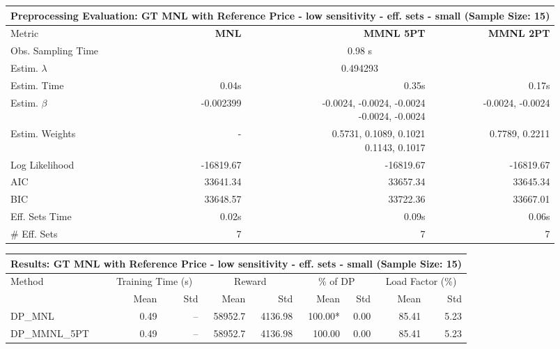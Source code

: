
\begin{samepage}
\begin{center}
  \small
  \begin{tabular}{l|r|r|r}
    \toprule
    \multicolumn{4}{c}{\textbf{Preprocessing Evaluation: GT MNL with Reference Price - low sensitivity - eff. sets - small (Sample Size: 15)}} \\
    \midrule
    Metric & \textbf{MNL} & \textbf{MMNL 5PT} & \textbf{MMNL 2PT} \\
    \midrule
    Obs. Sampling Time & \multicolumn{3}{c}{0.98 s} \\
    Estim. $\lambda$ & \multicolumn{3}{c}{0.494293} \\
    Estim. Time & 0.04s & 0.35s & 0.17s \\
    Estim. $\beta$ & -0.002399 & \makecell[tr]{-0.0024, -0.0024, -0.0024 \\ -0.0024, -0.0024} & -0.0024, -0.0024 \\
    Estim. Weights & - & \makecell[tr]{0.5731, 0.1089, 0.1021 \\ 0.1143, 0.1017} & 0.7789, 0.2211 \\
    Log Likelihood & -16819.67 & -16819.67 & -16819.67 \\
    AIC & 33641.34 & 33657.34 & 33645.34 \\
    BIC & 33648.57 & 33722.36 & 33667.01 \\
    Eff. Sets Time & 0.02s & 0.09s & 0.06s \\
    \# Eff. Sets & 7 & 7 & 7 \\
    \bottomrule
  \end{tabular}
\end{center}
\begin{center}
  \small
  \begin{tabular}{l|rr|rr|rr|rr}
    \toprule
    \multicolumn{9}{c}{\textbf{Results: GT MNL with Reference Price - low sensitivity - eff. sets - small (Sample Size: 15)}} \\
    \midrule
    Method & \multicolumn{2}{c|}{Training Time (s)} & \multicolumn{2}{c|}{Reward} & \multicolumn{2}{c|}{\% of DP} & \multicolumn{2}{c}{Load Factor (\%)} \\
    & Mean & Std & Mean & Std & Mean & Std & Mean & Std \\
    \midrule
    DP\_MNL      &     0.49 &    -- &    58952.7 &    4136.98 & 100.00* &    0.00 &   85.41 &    5.23 \\
    DP\_MMNL\_5PT &     0.49 &    -- &    58952.7 &    4136.98 &  100.00 &    0.00 &   85.41 &    5.23 \\

\end{tabular}
\end{center}
\end{samepage}
